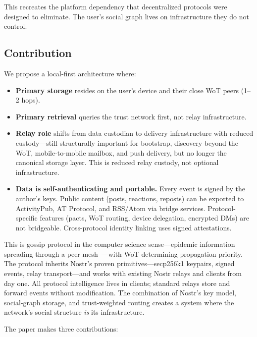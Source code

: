 \documentclass[11pt,a4paper]{article}
\begin{document}
This recreates the platform dependency that decentralized protocols were designed to eliminate. The user's social graph lives on infrastructure they do not control.

\subsection{Contribution}

We propose a local-first architecture where:

\begin{itemize}
  \item \textbf{Primary storage} resides on the user's device and their close WoT peers (1--2 hops).
  \item \textbf{Primary retrieval} queries the trust network first, not relay infrastructure.
  \item \textbf{Relay role} shifts from data custodian to delivery infrastructure with reduced custody---still structurally important for bootstrap, discovery beyond the WoT, mobile-to-mobile mailbox, and push delivery, but no longer the canonical storage layer. This is reduced relay custody, not optional infrastructure.
  \item \textbf{Data is self-authenticating and portable.} Every event is signed by the author's keys. Public content (posts, reactions, reposts) can be exported to ActivityPub, AT Protocol, and RSS/Atom via bridge services. Protocol-specific features (pacts, WoT routing, device delegation, encrypted DMs) are not bridgeable. Cross-protocol identity linking uses signed attestations.
\end{itemize}

This is gossip protocol in the computer science sense---epidemic information spreading through a peer mesh~\cite{vanrenesse}---with WoT determining propagation priority. The protocol inherits Nostr's proven primitives---secp256k1 keypairs, signed events, relay transport---and works with existing Nostr relays and clients from day one. All protocol intelligence lives in clients; standard relays store and forward events without modification. The combination of Nostr's key model, social-graph storage, and trust-weighted routing creates a system where the network's social structure \emph{is} its infrastructure.

The paper makes three contributions:
\end{document}
